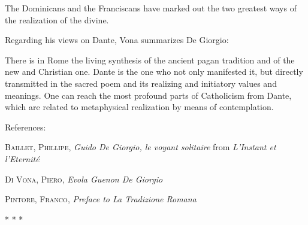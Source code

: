 \begin{quotex}
The Dominicans and the Franciscans have marked out the two greatest ways of the realization of the divine.
\end{quotex}


Regarding his views on Dante, Vona summarizes De Giorgio:

\begin{quotex}
There is in Rome the living synthesis of the ancient pagan tradition and of the new and Christian one. Dante is the one who not only manifested it, but directly transmitted in the sacred poem and its realizing and initiatory values and meanings. One can reach the most profound parts of Catholicism from Dante, which are related to metaphysical realization by means of contemplation.
\end{quotex}

References:

\textsc{Baillet, Phillipe}, \textit{Guido De Giorgio, le voyant solitaire} from \textit{L'Instant et l'Eternité}

\textsc{Di Vona, Piero}, \textit{Evola Guenon De Giorgio}

\textsc{Pintore, Franco}, \textit{Preface to La Tradizione Romana}



\begin{center}* * *\end{center}

